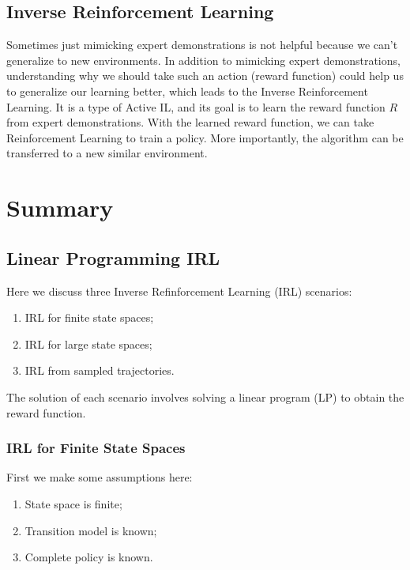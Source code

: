 \documentclass[11pt]{article}
\begin{document}
\subsection{Inverse Reinforcement Learning}
Sometimes just mimicking expert demonstrations is not helpful because we can’t generalize to new environments. In addition to mimicking expert demonstrations, understanding why we should take such an action (reward function) could help us to generalize our learning better, which leads to the Inverse Reinforcement Learning. It is a type of Active IL, and its goal is to learn the reward function $R$ from expert demonstrations. With the learned reward function, we can take Reinforcement Learning to train a policy. More importantly, the algorithm can be transferred to a new similar environment.

\section{Summary}
\subsection{Linear Programming IRL}
Here we discuss three Inverse Refinforcement Learning (IRL) scenarios:

\begin{enumerate}
\item IRL for finite state spaces;

\item IRL for large state spaces;

\item IRL from sampled trajectories.

\end{enumerate}

The solution of each scenario involves solving a linear program (LP) to obtain the reward function.

\subsubsection{IRL for Finite State Spaces}

First we make some assumptions here:

\begin{enumerate}
\item State space is finite;

\item Transition model is known;

\item Complete policy is known.

\end{enumerate}
\end{document}
